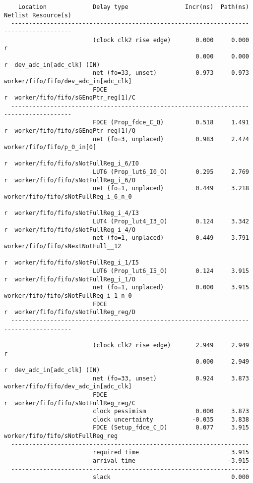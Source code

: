 \documentclass{article}
\begin{document}
\begin{lstlisting}
    Location             Delay type                Incr(ns)  Path(ns)    Netlist Resource(s)
  -------------------------------------------------------------------    -------------------
                         (clock clk2 rise edge)       0.000     0.000 r  
                                                      0.000     0.000 r  dev_adc_in[adc_clk] (IN)
                         net (fo=33, unset)           0.973     0.973    worker/fifo/fifo/dev_adc_in[adc_clk]
                         FDCE                                         r  worker/fifo/fifo/sGEnqPtr_reg[1]/C
  -------------------------------------------------------------------    -------------------
                         FDCE (Prop_fdce_C_Q)         0.518     1.491 r  worker/fifo/fifo/sGEnqPtr_reg[1]/Q
                         net (fo=3, unplaced)         0.983     2.474    worker/fifo/fifo/p_0_in[0]
                                                                      r  worker/fifo/fifo/sNotFullReg_i_6/I0
                         LUT6 (Prop_lut6_I0_O)        0.295     2.769 r  worker/fifo/fifo/sNotFullReg_i_6/O
                         net (fo=1, unplaced)         0.449     3.218    worker/fifo/fifo/sNotFullReg_i_6_n_0
                                                                      r  worker/fifo/fifo/sNotFullReg_i_4/I3
                         LUT4 (Prop_lut4_I3_O)        0.124     3.342 r  worker/fifo/fifo/sNotFullReg_i_4/O
                         net (fo=1, unplaced)         0.449     3.791    worker/fifo/fifo/sNextNotFull__12
                                                                      r  worker/fifo/fifo/sNotFullReg_i_1/I5
                         LUT6 (Prop_lut6_I5_O)        0.124     3.915 r  worker/fifo/fifo/sNotFullReg_i_1/O
                         net (fo=1, unplaced)         0.000     3.915    worker/fifo/fifo/sNotFullReg_i_1_n_0
                         FDCE                                         r  worker/fifo/fifo/sNotFullReg_reg/D
  -------------------------------------------------------------------    -------------------

                         (clock clk2 rise edge)       2.949     2.949 r  
                                                      0.000     2.949 r  dev_adc_in[adc_clk] (IN)
                         net (fo=33, unset)           0.924     3.873    worker/fifo/fifo/dev_adc_in[adc_clk]
                         FDCE                                         r  worker/fifo/fifo/sNotFullReg_reg/C
                         clock pessimism              0.000     3.873    
                         clock uncertainty           -0.035     3.838    
                         FDCE (Setup_fdce_C_D)        0.077     3.915    worker/fifo/fifo/sNotFullReg_reg
  -------------------------------------------------------------------
                         required time                          3.915    
                         arrival time                          -3.915    
  -------------------------------------------------------------------
                         slack                                  0.000    





\end{lstlisting}

\fontsize{6}{12}\selectfont
\end{document}
